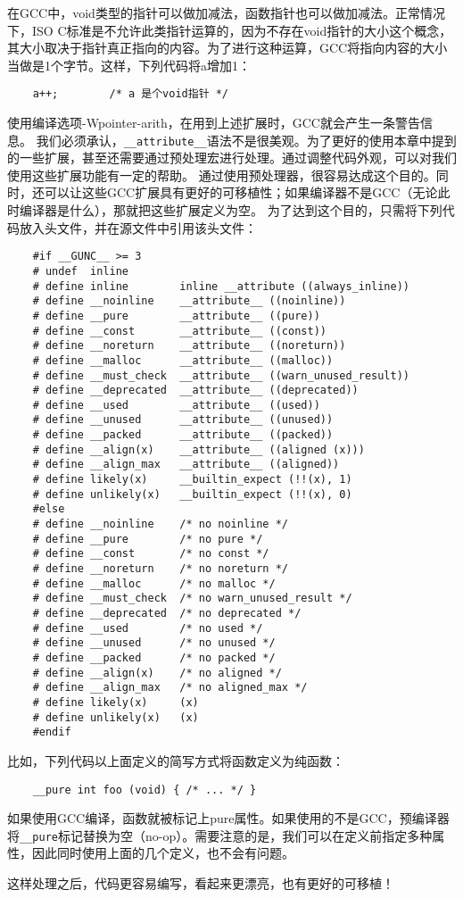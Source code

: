 在GCC中，void类型的指针可以做加减法，函数指针也可以做加减法。正常情况下，ISO C标准是不允许此类指针运算的，因为不存在void指针的大小这个概念，其大小取决于指针真正指向的内容。为了进行这种运算，GCC将指向内容的大小当做是1个字节。这样，下列代码将a增加1：
\begin{lstlisting}
    a++;        /* a 是个void指针 */
\end{lstlisting}
使用编译选项-Wpointer-arith，在用到上述扩展时，GCC就会产生一条警告信息。
我们必须承认，\verb+__attribute__+语法不是很美观。为了更好的使用本章中提到的一些扩展，甚至还需要通过预处理宏进行处理。通过调整代码外观，可以对我们使用这些扩展功能有一定的帮助。
通过使用预处理器，很容易达成这个目的。同时，还可以让这些GCC扩展具有更好的可移植性；如果编译器不是GCC（无论此时编译器是什么），那就把这些扩展定义为空。
为了达到这个目的，只需将下列代码放入头文件，并在源文件中引用该头文件：
\begin{lstlisting}
    #if __GUNC__ >= 3
    # undef  inline
    # define inline        inline __attribute ((always_inline))
    # define __noinline    __attribute__ ((noinline))
    # define __pure        __attribute__ ((pure))
    # define __const       __attribute__ ((const))
    # define __noreturn    __attribute__ ((noreturn))
    # define __malloc      __attribute__ ((malloc))
    # define __must_check  __attribute__ ((warn_unused_result))
    # define __deprecated  __attribute__ ((deprecated))
    # define __used        __attribute__ ((used))
    # define __unused      __attribute__ ((unused))
    # define __packed      __attribute__ ((packed))
    # define __align(x)    __attribute__ ((aligned (x)))
    # define __align_max   __attribute__ ((aligned))
    # define likely(x)     __builtin_expect (!!(x), 1)
    # define unlikely(x)   __builtin_expect (!!(x), 0)
    #else
    # define __noinline    /* no noinline */
    # define __pure        /* no pure */
    # define __const       /* no const */
    # define __noreturn    /* no noreturn */
    # define __malloc      /* no malloc */
    # define __must_check  /* no warn_unused_result */
    # define __deprecated  /* no deprecated */
    # define __used        /* no used */
    # define __unused      /* no unused */
    # define __packed      /* no packed */
    # define __align(x)    /* no aligned */
    # define __align_max   /* no aligned_max */
    # define likely(x)     (x)
    # define unlikely(x)   (x)
    #endif
\end{lstlisting}

比如，下列代码以上面定义的简写方式将函数定义为纯函数：
\begin{lstlisting}
    __pure int foo (void) { /* ... */ }
\end{lstlisting}
如果使用GCC编译，函数就被标记上pure属性。如果使用的不是GCC，预编译器将\verb+__pure+标记替换为空（no-op）。需要注意的是，我们可以在定义前指定多种属性，因此同时使用上面的几个定义，也不会有问题。

这样处理之后，代码更容易编写，看起来更漂亮，也有更好的可移植！












